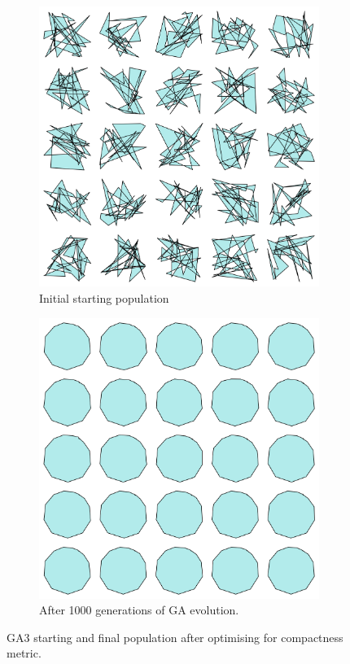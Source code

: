\documentclass{article}
\begin{document}
\begin{figure}[H]
    \centering
    \begin{subfigure}[b]{0.45\textwidth}
        \centering
        \includegraphics[width=\textwidth]{figures/GAResults/GA3/30point_initial_pop.png}
        \caption{Initial starting population}
        \label{fig:GA3_starting}
    \end{subfigure}
    \hfill
    \begin{subfigure}[b]{0.45\textwidth}
        \centering
        \includegraphics[width=\textwidth]{figures/GAResults/GA3/final_population.png}
        \caption{After 1000 generations of GA evolution.}
        \label{fig:GA3_final}
    \end{subfigure}
    \caption{GA3 starting and final population after optimising for compactness metric.}
    \label{fig:GA3_before_after_GA}
\end{figure}
\end{document}
